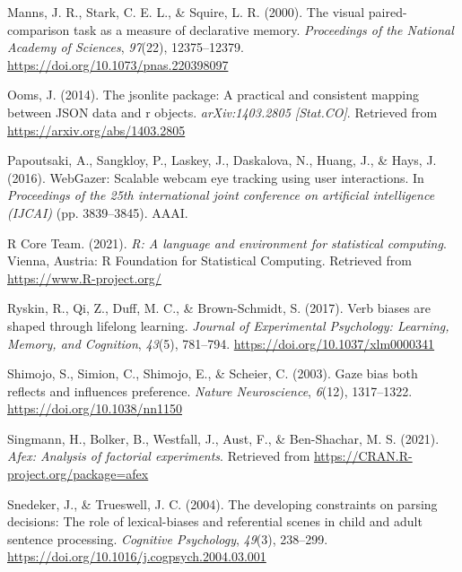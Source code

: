 \documentclass[
  english,
  man,floatsintext]{apa6}
\newlength{\cslhangindent}
\newlength{\cslentryspacingunit} %
\newenvironment{CSLReferences}[2] %
 {%
  \setlength{\parindent}{0pt}
  \ifodd #1
  \let\oldpar\par
  \def\par{\hangindent=\cslhangindent\oldpar}
  \fi
  \setlength{\parskip}{#2\cslentryspacingunit}
 }%
 {}
\begin{document}
\begin{CSLReferences}{1}{0}
\leavevmode{}%
Manns, J. R., Stark, C. E. L., \& Squire, L. R. (2000). The visual paired-comparison task as a measure of declarative memory. \emph{Proceedings of the National Academy of Sciences}, \emph{97}(22), 12375--12379. \url{https://doi.org/10.1073/pnas.220398097}

\leavevmode{}%
Ooms, J. (2014). The jsonlite package: A practical and consistent mapping between JSON data and r objects. \emph{arXiv:1403.2805 {[}Stat.CO{]}}. Retrieved from \url{https://arxiv.org/abs/1403.2805}

\leavevmode{}%
Papoutsaki, A., Sangkloy, P., Laskey, J., Daskalova, N., Huang, J., \& Hays, J. (2016). {WebGazer}: {Scalable} webcam eye tracking using user interactions. In \emph{Proceedings of the 25th international joint conference on artificial intelligence ({IJCAI})} (pp. 3839--3845). {AAAI}.

\leavevmode{}%
R Core Team. (2021). \emph{R: A language and environment for statistical computing}. Vienna, Austria: R Foundation for Statistical Computing. Retrieved from \url{https://www.R-project.org/}

\leavevmode{}%
Ryskin, R., Qi, Z., Duff, M. C., \& Brown-Schmidt, S. (2017). Verb biases are shaped through lifelong learning. \emph{Journal of Experimental Psychology: Learning, Memory, and Cognition}, \emph{43}(5), 781--794. \url{https://doi.org/10.1037/xlm0000341}

\leavevmode{}%
Shimojo, S., Simion, C., Shimojo, E., \& Scheier, C. (2003). Gaze bias both reflects and influences preference. \emph{Nature Neuroscience}, \emph{6}(12), 1317--1322. \url{https://doi.org/10.1038/nn1150}

\leavevmode{}%
Singmann, H., Bolker, B., Westfall, J., Aust, F., \& Ben-Shachar, M. S. (2021). \emph{Afex: Analysis of factorial experiments}. Retrieved from \url{https://CRAN.R-project.org/package=afex}

\leavevmode{}%
Snedeker, J., \& Trueswell, J. C. (2004). The developing constraints on parsing decisions: {The} role of lexical-biases and referential scenes in child and adult sentence processing. \emph{Cognitive Psychology}, \emph{49}(3), 238--299. \url{https://doi.org/10.1016/j.cogpsych.2004.03.001}


\end{CSLReferences}
\end{document}
